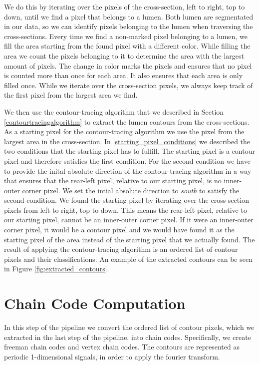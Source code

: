 \documentclass[thesis.tex]{subfiles}
\begin{document}
We do this by iterating over the pixels of the cross-section, left to right, top to down, until we find a pixel that belongs to a lumen. Both lumen are segmentated in our data, so we can identify pixels belonging to the lumen when traversing the cross-sections. Every time we find a non-marked pixel belonging to a lumen, we fill the area starting from the found pixel with a different color. While filling the area we count the pixels belonging to it to determine the area with the largest amount of pixels. The change in color marks the pixels and ensures that no pixel is counted more than once for each area. It also ensures that each area is only filled once. While we iterate over the cross-section pixels, we always keep track of the first pixel from the largest area we find.   

We then use the contour-tracing algorithm that we described in Section \ref{contourtracingalgorithm} to extract the lumen contours from the cross-sections. As a starting pixel for the contour-tracing algorithm we use the pixel from the largest area in the cross-section. In \ref{starting_pixel_conditions} we described the two conditions that the starting pixel has to fulfill. The starting pixel is a contour pixel and therefore satisfies the first condition. For the second condition we have to provide the inital absolute direction of the contour-tracing algorithm in a way that ensures that the rear-left pixel, relative to our starting pixel, is no inner-outer corner pixel. We set the intial absolute direction to \textit{south} to satisfy the second condition. We found the starting pixel by iterating over the cross-section pixels from left to right, top to down. This means the rear-left pixel, relative to our starting pixel, cannot be an inner-outer corner pixel. If it were an inner-outer corner pixel, it would be a contour pixel and we would have found it as the starting pixel of the area instead of the starting pixel that we actually found. The result of applying the contour-tracing algorithm is an ordered list of contour pixels and their classifications.
An example of the extracted contours can be seen in Figure \ref{fig:extracted_contours}.

\section{Chain Code Computation}
\label{section:chaincode}
In this step of the pipeline we convert the ordered list of contour pixels, which we extracted in the last step of the pipeline, into chain codes. Specifically, we create freeman chain codes and vertex chain codes. The contours are represented as periodic 1-dimensional signals, in order to apply the fourier transform.\\
\end{document}
